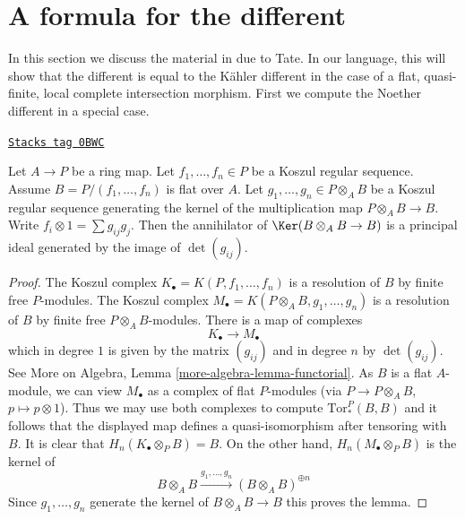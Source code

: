 \section{A formula for the different}
\label{discriminant-section-formula-different}
In this section we discuss the material in \cite[Appendix A]{Mazur-Roberts}
due to Tate. In our language, this will show that the different is
equal to the K\"ahler different in the case of a flat, quasi-finite,
local complete intersection morphism.
First we compute the Noether different in a special case.

\begin{lemma}[Tate]
\label{discriminant-lemma-tate}
\href{https://stacks.math.columbia.edu/tag/0BWC}{\texttt{Stacks tag 0BWC}}

\begin{reference}
\cite[Appendix]{Mazur-Roberts}
\end{reference}
Let $A \to P$ be a ring map. Let $f_1, \ldots, f_n \in P$ be a
Koszul regular sequence. Assume $B = P/(f_1, \ldots, f_n)$
is flat over $A$. Let $g_1, \ldots, g_n \in P \otimes_A B$
be a Koszul regular sequence generating the kernel of the multiplication
map $P \otimes_A B \to B$. Write $f_i \otimes 1 = \sum g_{ij} g_j$.
Then the annihilator of $\Ker(B \otimes_A B \to B)$ is a principal
ideal generated by the image of $\det(g_{ij})$.
\end{lemma}

\begin{proof}
The Koszul complex $K_\bullet = K(P, f_1, \ldots, f_n)$ is a resolution
of $B$ by finite free $P$-modules. The Koszul complex
$M_\bullet = K(P \otimes_A B, g_1, \ldots, g_n)$ is a resolution
of $B$ by finite free $P \otimes_A B$-modules. There is a map of
complexes
$$
K_\bullet \longrightarrow M_\bullet
$$
which in degree $1$ is given by the matrix $(g_{ij})$ and
in degree $n$ by $\det(g_{ij})$. See
More on Algebra, Lemma \ref{more-algebra-lemma-functorial}.
As $B$ is a flat $A$-module, we can view $M_\bullet$ as a complex
of flat $P$-modules (via $P \to P \otimes_A B$, $p \mapsto p \otimes 1$).
Thus we may use both complexes to compute $\text{Tor}_*^P(B, B)$ and
it follows that the displayed map defines a quasi-isomorphism after tensoring
with $B$. It is clear that $H_n(K_\bullet \otimes_P B) = B$.
On the other hand, $H_n(M_\bullet \otimes_P B)$ is the kernel of
$$
B \otimes_A B \xrightarrow{g_1, \ldots, g_n} (B \otimes_A B)^{\oplus n}
$$
Since $g_1, \ldots, g_n$ generate the kernel of $B \otimes_A B \to B$
this proves the lemma.
\end{proof}

